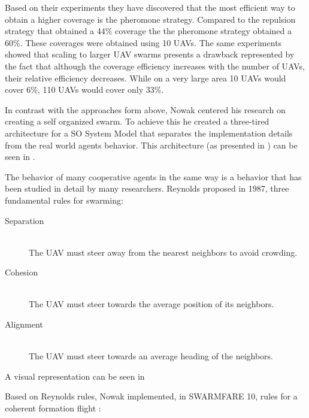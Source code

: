 Based on their experiments they have discovered that the most efficient way to
obtain a higher coverage is the pheromone strategy. Compared to the repulsion 
strategy that obtained a 44\% coverage the the pheromone strategy obtained a 
60\%. These coverages were obtained using 10 UAVs. The same experiments showed
that scaling to larger UAV swarms presents a drawback represented by the fact
that although the coverage efficiency increases with the number of UAVs, 
their relative efficiency decreases. While on a very large area 10 UAVs would
cover 6\%, 110 UAVs would cover only 33\%.

In contrast with the approaches form above, Nowak centered his research on 
creating a self organized swarm. To achieve this he created a three-tired architecture
for a SO System Model that separates the implementation 
details from the real world agents behavior. This architecture (as presented in
  \cite{so}) can be seen in  .

\newpage

The behavior of many cooperative agents in the same way is a behavior that
has been studied in detail by many researchers. Reynolds proposed in 1987, 
three fundamental rules for swarming: \cite{swarmrules}

\begin{description}
\item [Separation] \hfill \\ The UAV must steer away from the nearest neighbors to avoid crowding.
\item [Cohesion] \hfill \\ The UAV must steer towards the average position of its neighbors.
\item [Alignment] \hfill \\ The UAV must steer towards an average heading of the neighbors.
\end{description}

A visual representation can be seen in 


Based on Reynolds rules, Nowak implemented, in SWARMFARE 10, rules for a coherent
formation flight \cite{so}:


